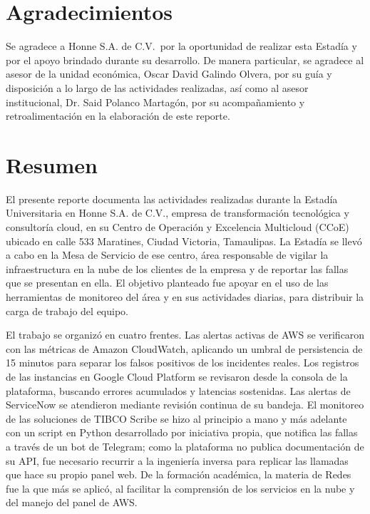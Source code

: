 \documentclass[12pt]{article}
\newcommand{\UnidadEconomica}{Honne S.A. de C.V.}
\newcommand{\nasesorempresaria}   {Oscar David Galindo Olvera}
\newcommand{\nasesorinstitucional}{Dr. Said Polanco Martagón}
\begin{document}





\clearpage
\ClearWallPaper
\thispagestyle{fancy}
\section*{Agradecimientos}

Se agradece a \UnidadEconomica\ por la oportunidad de realizar esta Estadía y por el apoyo brindado durante su desarrollo. De manera particular, se agradece al asesor de la unidad económica, \nasesorempresaria, por su guía y disposición a lo largo de las actividades realizadas, así como al asesor institucional, \nasesorinstitucional, por su acompañamiento y retroalimentación en la elaboración de este reporte.

\clearpage
\thispagestyle{fancy}
\section*{Resumen}

El presente reporte documenta las actividades realizadas durante la Estadía Universitaria en \UnidadEconomica, empresa de transformación tecnológica y consultoría cloud, en su Centro de Operación y Excelencia Multicloud (CCoE) ubicado en calle 533 Maratines, Ciudad Victoria, Tamaulipas. La Estadía se llevó a cabo en la Mesa de Servicio de ese centro, área responsable de vigilar la infraestructura en la nube de los clientes de la empresa y de reportar las fallas que se presentan en ella. El objetivo planteado fue apoyar en el uso de las herramientas de monitoreo del área y en sus actividades diarias, para distribuir la carga de trabajo del equipo.

El trabajo se organizó en cuatro frentes. Las alertas activas de AWS se verificaron con las métricas de Amazon CloudWatch, aplicando un umbral de persistencia de 15 minutos para separar los falsos positivos de los incidentes reales. Los registros de las instancias en Google Cloud Platform se revisaron desde la consola de la plataforma, buscando errores acumulados y latencias sostenidas. Las alertas de ServiceNow se atendieron mediante revisión continua de su bandeja. El monitoreo de las soluciones de TIBCO Scribe se hizo al principio a mano y más adelante con un script en Python desarrollado por iniciativa propia, que notifica las fallas a través de un bot de Telegram; como la plataforma no publica documentación de su API, fue necesario recurrir a la ingeniería inversa para replicar las llamadas que hace su propio panel web. De la formación académica, la materia de Redes fue la que más se aplicó, al facilitar la comprensión de los servicios en la nube y del manejo del panel de AWS.
\end{document}
